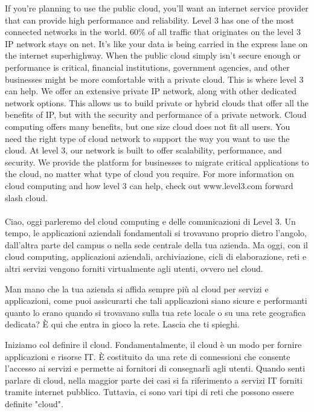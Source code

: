 {If you're planning to use the public cloud, you'll want an internet service provider that can provide high performance and reliability. Level 3 has one of the most connected networks in the world. 60\% of all traffic that originates on the level 3 IP network stays on net. It's like your data is being carried in the express lane on the internet superhighway. When the public cloud simply isn't secure enough or performance is critical, financial institutions, government agencies, and other businesses might be more comfortable with a private cloud. 
This is where level 3 can help. We offer an extensive private IP network, along with other dedicated network options. This allows us to build private or hybrid clouds that offer all the benefits of IP, but with the security and performance of a private network. Cloud computing offers many benefits, but one size cloud does not fit all users. You need the right type of cloud network to support the way you want to use the cloud. 
At level 3, our network is built to offer scalability, performance, and security. 
We provide the platform for businesses to migrate critical applications to the cloud, no matter what type of cloud you require. For more information on cloud computing and how level 3 can help, check out www.level3.com forward slash cloud.}
\\
\\
Ciao, oggi parleremo del cloud computing e delle comunicazioni di Level 3. Un tempo, le applicazioni aziendali fondamentali si trovavano proprio dietro l’angolo, dall’altra parte del campus o nella sede centrale della tua azienda. Ma oggi, con il cloud computing, applicazioni aziendali, archiviazione, cicli di elaborazione, reti e altri servizi vengono forniti virtualmente agli utenti, ovvero nel cloud.

Man mano che la tua azienda si affida sempre più al cloud per servizi e applicazioni, come puoi assicurarti che tali applicazioni siano sicure e performanti quanto lo erano quando si trovavano sulla tua rete locale o su una rete geografica dedicata? È qui che entra in gioco la rete. Lascia che ti spieghi.

Iniziamo col definire il cloud. Fondamentalmente, il cloud è un modo per fornire applicazioni e risorse IT. È costituito da una rete di connessioni che consente l’accesso ai servizi e permette ai fornitori di consegnarli agli utenti. Quando senti parlare di cloud, nella maggior parte dei casi si fa riferimento a servizi IT forniti tramite internet pubblico. Tuttavia, ci sono vari tipi di reti che possono essere definite "cloud".

